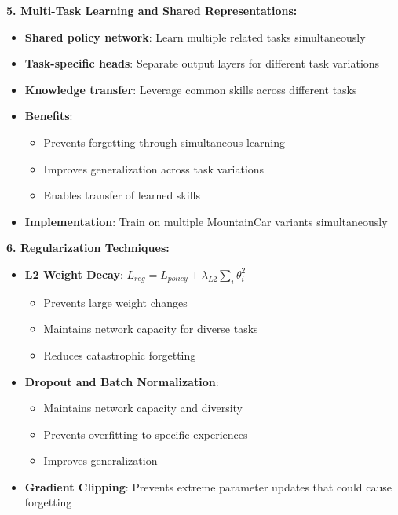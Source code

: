 \documentclass[12pt]{article}
\begin{document}
{{{\textbf{5. Multi-Task Learning and Shared Representations:}
\begin{itemize}
    \item \textbf{Shared policy network}: Learn multiple related tasks simultaneously
    \item \textbf{Task-specific heads}: Separate output layers for different task variations
    \item \textbf{Knowledge transfer}: Leverage common skills across different tasks
    \item \textbf{Benefits}:
    \begin{itemize}
        \item Prevents forgetting through simultaneous learning
        \item Improves generalization across task variations
        \item Enables transfer of learned skills
    \end{itemize}
    \item \textbf{Implementation}: Train on multiple MountainCar variants simultaneously
\end{itemize}

\textbf{6. Regularization Techniques:}
\begin{itemize}
    \item \textbf{L2 Weight Decay}: $L_{reg} = L_{policy} + \lambda_{L2} \sum_i \theta_i^2$
    \begin{itemize}
        \item Prevents large weight changes
        \item Maintains network capacity for diverse tasks
        \item Reduces catastrophic forgetting
    \end{itemize}
    \item \textbf{Dropout and Batch Normalization}: 
    \begin{itemize}
        \item Maintains network capacity and diversity
        \item Prevents overfitting to specific experiences
        \item Improves generalization
    \end{itemize}
    \item \textbf{Gradient Clipping}: Prevents extreme parameter updates that could cause forgetting
\end{itemize}

}}}
\end{document}
